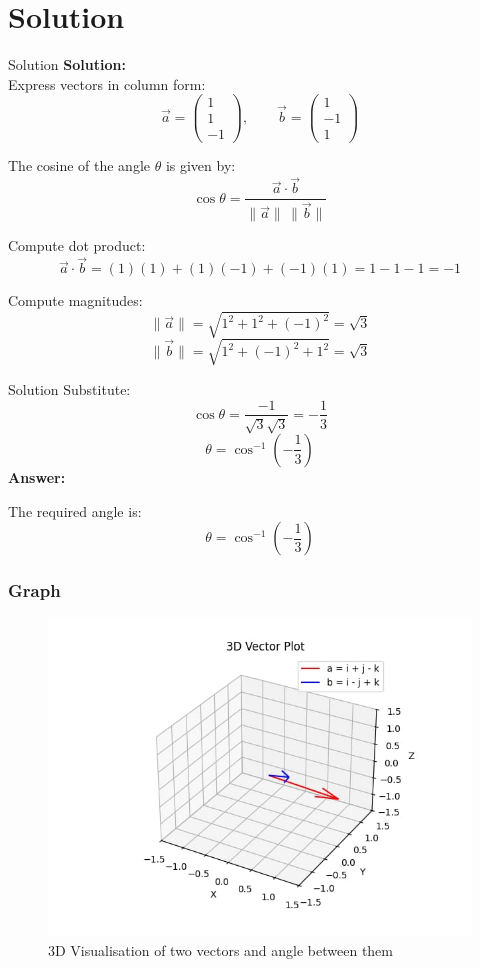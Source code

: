 \documentclass{beamer}
\theoremstyle{remark}
\newcommand{\myvec}[1]{\ensuremath{\begin{pmatrix}#1\end{pmatrix}}}
\numberwithin{equation}{section}
\begin{document}
\section{Solution}
\begin{frame}{Solution}
\textbf{Solution:} 
\\
Express vectors in column form:
\[
\vec{a} = \myvec{1 \\ 1 \\ -1},
\qquad
\vec{b} = \myvec{1 \\ -1 \\ 1}
\]

The cosine of the angle \(\theta\) is given by:
\[
\cos\theta = \frac{\vec{a} \cdot \vec{b}}{\|\vec{a}\| \, \|\vec{b}\|}
\]

Compute dot product:
\[
\vec{a} \cdot \vec{b} = (1)(1) + (1)(-1) + (-1)(1) = 1 - 1 - 1 = -1
\]

Compute magnitudes:
\[
\|\vec{a}\| = \sqrt{1^2 + 1^2 + (-1)^2} = \sqrt{3}
\]
\[
\|\vec{b}\| = \sqrt{1^2 + (-1)^2 + 1^2} = \sqrt{3}
\]


\end{frame}
\begin{frame}{Solution}
    Substitute:
\[
\cos\theta = \frac{-1}{\sqrt{3}\sqrt{3}} = -\frac{1}{3}
\]
\[
\theta = \cos^{-1}\left(-\frac{1}{3}\right)
\]
\vspace{2mm}
\textbf{Answer:}

The required angle is:
\[
\boxed{\theta = \cos^{-1}\left(-\frac{1}{3}\right)}
\]
\end{frame}
\begin{frame}
    \frametitle{Graph}
    \begin{figure}[h!]
        \centering
        \includegraphics[width=0.7\linewidth]{FIG/graph.png}
        \caption{3D Visualisation of two vectors and angle between them}
    \end{figure}
\end{frame}
\end{document}
